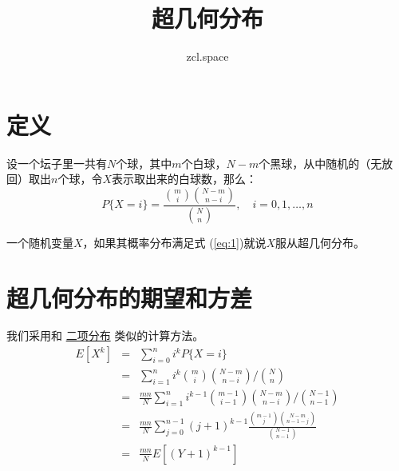 \documentclass[10pt,a4paper,UTF8]{article}
\author{zcl.space}
\date{}
\title{超几何分布}
\begin{document}
\maketitle
\tableofcontents
{}


\section{定义}
\label{sec:org853d906}


设一个坛子里一共有\(N\)个球，其中\(m\)个白球，\(N-m\)个黑球，从中随机的（无放回）取出\(n\)个球，令\(X\)表示取出来的白球数，那么：
\begin{equation}
\label{eq:1}
P\{X = i\} = \frac{\binom{m}{i} \binom{N-m}{n-i}}{\binom{N}{n}},\quad i = 0,1,\ldots ,n
\end{equation}

一个随机变量\(X\)，如果其概率分布满足式 (\ref{eq:1})就说\(X\)服从超几何分布。
\section{超几何分布的期望和方差}
\label{sec:org98ac021}


我们采用和 \href{binary-distribution.org}{二项分布} 类似的计算方法。
\begin{eqnarray}
\label{eq:2}
E[X^{k}]&=& \sum_{i=0}^{n}i^{k}P\{X=i\} \\
&=& \sum_{i=1}^{n}i^{k}\binom{m}{i}\binom{N-m}{n-i}/\binom{N}{n}\\
&=&\frac{mn}{N}\sum_{i=1}^{n}i^{k-1}\binom{m-1}{i-1}\binom{N-m}{n-i}/\binom{N-1}{n-1}\\
&=&\frac{mn}{N}\sum_{j=0}^{n-1}(j+1)^{k-1}\frac{\binom{m-1}{j}\binom{N-m}{n-1-j}}{\binom{N-1}{n-1}}\\
&=& \frac{mn}{N}E[(Y+1)^{k-1}]
\end{eqnarray}
\end{document}
